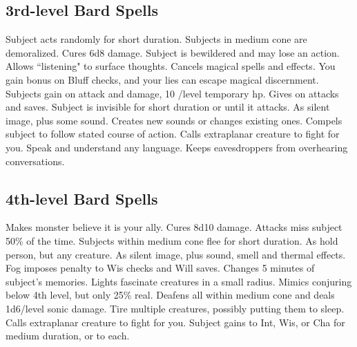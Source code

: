 \subsection{3rd-level Bard Spells}
\begin{spelllist}
 Subject acts randomly for short duration.
 Subjects in medium cone are demoralized.
 Cures 6d8 damage.
 Subject is bewildered and may lose an action.
 Allows ``listening" to surface thoughts.
 Cancels magical spells and effects.
 You gain  bonus on Bluff checks, and your lies can escape magical discernment.
 Subjects gain  on attack and damage, 10 /level temporary hp.
 Gives  on attacks and saves.
 Subject is invisible for short duration or until it attacks.
 As silent image, plus some sound.
 Creates new sounds or changes existing ones.
 Compels subject to follow stated course of action.
 Calls extraplanar creature to fight for you.
 Speak and understand any language.
 Keeps eavesdroppers from overhearing conversations.
\end{spelllist}

\subsection{4th-level Bard Spells}
\begin{spelllist} 
 Makes monster believe it is your ally.
 Cures 8d10 damage.
 Attacks miss subject 50\% of the time.
 Subjects within medium cone flee for short duration.
 As hold person, but any creature.
 As silent image, plus sound, smell and thermal effects.
 Fog imposes  penalty to Wis checks and Will saves.
 Changes 5 minutes of subject's memories.
 Lights fascinate creatures in a small radius.
 Mimics conjuring below 4th level, but only 25\% real.
 Deafens all within medium cone and deals 1d6/level sonic damage.
 Tire multiple creatures, possibly putting them to sleep.
 Calls extraplanar creature to fight for you.
 Subject gains  to Int, Wis, or Cha for medium duration, or  to each.%
\end{spelllist}


